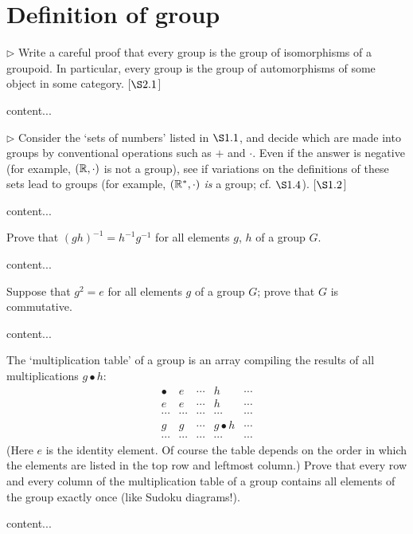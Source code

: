 \section{Definition of group}
\extitle
\begin{exercise}
	$\triangleright$ Write a careful proof that every group is the group of isomorphisms of a groupoid. In particular, every group is the group of automorphisms of some object in some category. [$\S 2.1$]
\end{exercise}
\begin{solution}
	content...
\end{solution}

\begin{exercise}
	$\triangleright$ Consider the `sets of numbers' listed in $\S 1.1$, and decide which are made into groups by conventional operations such as $+$ and $\cdot$. Even if the answer is negative (for example, $(\mathbb{R}, \cdot)$ is not a group), see if variations on the definitions of these sets lead to groups (for example, $(\mathbb{R}^{*}, \cdot)$ \emph{is} a group; cf. $\S 1.4$). [$\S 1.2$] 
\end{exercise}
\begin{solution}
	content...
\end{solution}

\begin{exercise}
	Prove that $(gh)^{-1} = h^{-1}g^{-1}$ for all elements $g$, $h$ of a group $G$.
\end{exercise}
\begin{solution}
	content...
\end{solution}

\begin{exercise}
	Suppose that $g^2 = e$ for all elements $g$ of a group $G$; prove that $G$ is commutative.
\end{exercise}
\begin{solution}
	content...
\end{solution}

\begin{exercise}
	The `multiplication table' of a group is an array compiling the results of all multiplications $g\bullet h$:
	{%
	\renewcommand{\arraystretch}{1.5}
	\[
		\begin{array}{c||c|c|c|c}
			\bullet & e & \cdots & h & \cdots\\
			\hline
			\hline
			e & e & \cdots & h & \cdots \\
			\hline
			\cdots & \cdots & \cdots & \cdots & \cdots \\
			\hline
			g & g & \cdots & g\bullet h & \cdots \\
			\hline
			\cdots & \cdots & \cdots & \cdots & \cdots 
		\end{array}
	\]
	}
	(Here $e$ is the identity element. Of course the table depends on the order in which the elements are listed in the top row and leftmost column.) Prove that every row and every column of the multiplication table of a group contains all elements of the group exactly once (like Sudoku diagrams!).
\end{exercise}
\begin{solution}
	content...
\end{solution}

